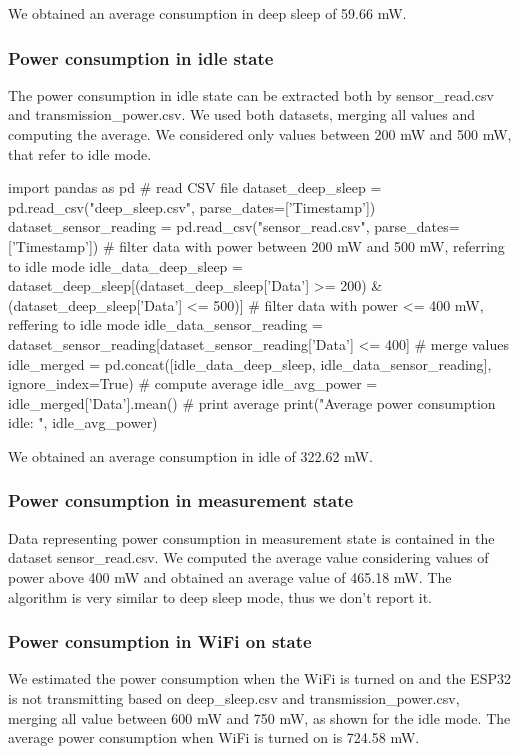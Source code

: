 We obtained an average consumption in deep sleep of 59.66 mW.

\subsubsection{Power consumption in idle state}
The power consumption in idle state can be extracted both by sensor\_read.csv and transmission\_power.csv. We used both datasets, merging all values and computing the average. We considered only values between 200 mW and 500 mW, that refer to idle mode.
\begin{python}
import pandas as pd 
# read CSV file 
dataset_deep_sleep = pd.read_csv("deep_sleep.csv", parse_dates=['Timestamp'])
dataset_sensor_reading = pd.read_csv("sensor_read.csv", parse_dates=['Timestamp'])
# filter data with power between 200 mW and 500 mW, referring to idle mode
idle_data_deep_sleep = dataset_deep_sleep[(dataset_deep_sleep['Data'] >= 200) & (dataset_deep_sleep['Data'] <= 500)]
# filter data with power <= 400 mW, reffering to idle mode
idle_data_sensor_reading = dataset_sensor_reading[dataset_sensor_reading['Data'] <= 400]
# merge values 
idle_merged = pd.concat([idle_data_deep_sleep, idle_data_sensor_reading], ignore_index=True)
# compute average
idle_avg_power = idle_merged['Data'].mean()
# print average 
print("Average power consumption idle: ", idle_avg_power)
\end{python}

We obtained an average consumption in idle of 322.62 mW.

\subsubsection{Power consumption in measurement state}
Data representing power consumption in measurement state is contained in the dataset sensor\_read.csv. We computed the average value considering values of power above 400 mW and obtained an average value of 465.18 mW. The algorithm is very similar to deep sleep mode, thus we don't report it.

\subsubsection{Power consumption in WiFi on state}
We estimated the power consumption when the WiFi is turned on and the ESP32 is not transmitting based on deep\_sleep.csv and transmission\_power.csv, merging all value between 600 mW and 750 mW, as shown for the idle mode. The average power consumption when WiFi is turned on is 724.58 mW.


